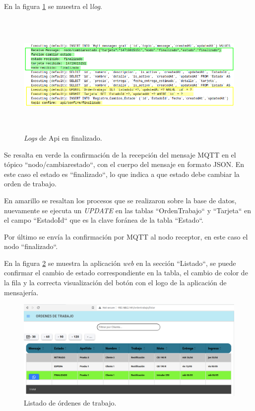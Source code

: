 En la figura \ref{fig:ensayofinalizadoapi} se muestra el l\textit{log}.

\begin{figure}[H]
	\centering
	\includegraphics[width=\textwidth, height=6cm]{./Figures/ensayo-1/13.finalizado-api-logs.png}
	\caption{\textit{Logs} de Api en finalizado.}
	\label{fig:ensayofinalizadoapi}
\end{figure}

Se resalta en verde la confirmación de la recepción del mensaje MQTT en el tópico ``nodo/cambiarestado``, con el cuerpo del mensaje en formato JSON. En este caso el estado es ``finalizado``, lo que indica a que estado debe cambiar la orden de trabajo.

En amarillo se resaltan los procesos que se realizaron sobre la base de datos, nuevamente se ejecuta un \textit{UPDATE} en las tablas ``OrdenTrabajo`` y ``Tarjeta`` en el campo ``EstadoId`` que es la clave foránea de la tabla ``Estado``.

Por último se envía la confirmación por MQTT al nodo receptor, en este caso el nodo ``finalizado``.

En la figura \ref{fig:ensayofinalizadolistado} se muestra la aplicación \textit{web} en la sección ``Listado``, se puede confirmar el cambio de estado correspondiente en la tabla, el cambio de color de la fila y la correcta visualización del botón con el logo de la aplicación de mensajería.

\begin{figure}[H]
	\centering
	\includegraphics[width=\textwidth]{./Figures/ensayo-1/14.finalizado-listado.png}
	\caption{Listado de órdenes de trabajo.}
	\label{fig:ensayofinalizadolistado}
\end{figure}


